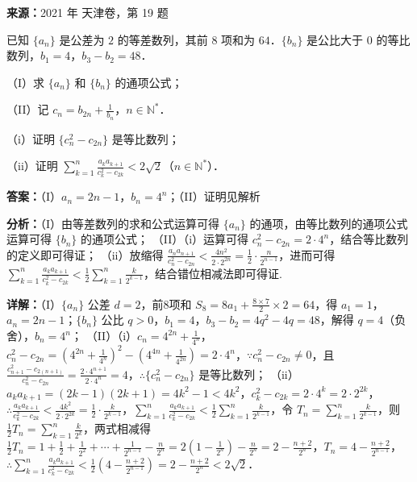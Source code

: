 \begin{question}[points=15]
\textbf{来源：}2021 年 天津卷，第 19 题\par
已知 $\{a_n\}$ 是公差为 $2$ 的等差数列，其前 $8$ 项和为 $64$．$\{b_n\}$ 是公比大于 $0$ 的等比数列，$b_1 = 4$，$b_3 - b_2 = 48$．

（I）求 $\{a_n\}$ 和 $\{b_n\}$ 的通项公式；

（II）记 $c_n = b_{2n} + \frac{1}{b_n}$，$n \in \mathbb{N}^*$．

（i）证明 $\{c_n^2 - c_{2n}\}$ 是等比数列；

（ii）证明 $\sum_{k=1}^n \frac{a_k a_{k+1}}{c_k^2 - c_{2k}} < 2\sqrt{2}$（$n \in \mathbb{N}^*$）．
\begin{solution}
\textbf{答案：}（I）$a_n = 2n-1$，$b_n = 4^n$；（II）证明见解析

\textbf{分析：}（I）由等差数列的求和公式运算可得 $\{a_n\}$ 的通项，由等比数列的通项公式运算可得 $\{b_n\}$ 的通项公式；
（II）（i）运算可得 $c_n^2 - c_{2n} = 2 \cdot 4^n$，结合等比数列的定义即可得证；
（ii）放缩得 $\frac{a_n a_{n+1}}{c_n^2 - c_{2n}} < \frac{4n^2}{2 \cdot 2^{2n}} = \frac{1}{2} \cdot \frac{n}{2^{n-1}}$，进而可得 $\sum_{k=1}^n \frac{a_k a_{k+1}}{c_k^2 - c_{2k}} < \frac{1}{2} \sum_{k=1}^n \frac{k}{2^{k-1}}$，结合错位相减法即可得证.

\textbf{详解：}（I）$\{a_n\}$ 公差 $d=2$，前8项和 $S_8 = 8a_1 + \frac{8\times7}{2}\times2 = 64$，得 $a_1=1$，$a_n = 2n-1$；$\{b_n\}$ 公比 $q>0$，$b_1=4$，$b_3-b_2=4q^2-4q=48$，解得 $q=4$（负舍），$b_n=4^n$；
（II）（i）$c_n = 4^{2n} + \frac{1}{4^n}$，$c_n^2 - c_{2n} = \left(4^{2n} + \frac{1}{4^n}\right)^2 - \left(4^{4n} + \frac{1}{4^{2n}}\right) = 2\cdot4^n$，$\because c_n^2 - c_{2n} \neq 0$，且 $\frac{c_{n+1}^2 - c_{2(n+1)}}{c_n^2 - c_{2n}} = \frac{2\cdot4^{n+1}}{2\cdot4^n} = 4$，$\therefore \{c_n^2 - c_{2n}\}$ 是等比数列；
（ii）$a_k a_{k+1} = (2k-1)(2k+1) = 4k^2-1 < 4k^2$，$c_k^2 - c_{2k} = 2\cdot4^k = 2\cdot2^{2k}$，$\therefore \frac{a_k a_{k+1}}{c_k^2 - c_{2k}} < \frac{4k^2}{2\cdot2^{2k}} = \frac{1}{2}\cdot\frac{k}{2^{k-1}}$，$\sum_{k=1}^n \frac{a_k a_{k+1}}{c_k^2 - c_{2k}} < \frac{1}{2} \sum_{k=1}^n \frac{k}{2^{k-1}}$，令 $T_n = \sum_{k=1}^n \frac{k}{2^{k-1}}$，则 $\frac{1}{2}T_n = \sum_{k=1}^n \frac{k}{2^k}$，两式相减得 $\frac{1}{2}T_n = 1+\frac{1}{2}+\frac{1}{2^2}+\cdots+\frac{1}{2^{n-1}} - \frac{n}{2^n} = 2\left(1-\frac{1}{2^n}\right) - \frac{n}{2^n} = 2 - \frac{n+2}{2^n}$，$T_n = 4 - \frac{n+2}{2^{n-1}}$，$\therefore \sum_{k=1}^n \frac{a_k a_{k+1}}{c_k^2 - c_{2k}} < \frac{1}{2}\left(4 - \frac{n+2}{2^{n-1}}\right) = 2 - \frac{n+2}{2^n} < 2\sqrt{2}$．
\end{solution}
\end{question}

